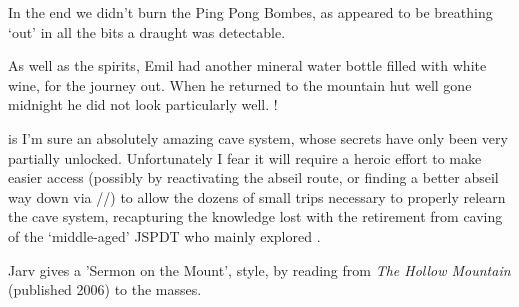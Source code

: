 In the end we didn't burn the Ping Pong Bombes, as 
appeared to be breathing `out' in all the bits a draught was detectable.

As well as the spirits, Emil had another mineral water bottle filled
with white wine, for the journey out. When he returned to the mountain
hut well gone midnight he did not look particularly well. !

 is I'm sure an absolutely amazing cave system, whose
secrets have only been very partially unlocked. Unfortunately I fear it
will require a heroic effort to make easier access (possibly by
reactivating the abseil route, or finding a better abseil way down via
//) to allow the dozens of small trips necessary to
properly relearn the cave system, recapturing the knowledge lost with
the retirement from caving of the `middle-aged' JSPDT who mainly
explored .



\begin{pagefigure}
      \checkoddpage \ifoddpage \forcerectofloat \else \forceversofloat \fi
      \centering
  \caption{Jarv gives a 'Sermon on the Mount',  style, by reading from \textit{The Hollow Mountain} (published 2006) to the masses. }
\end{pagefigure}

